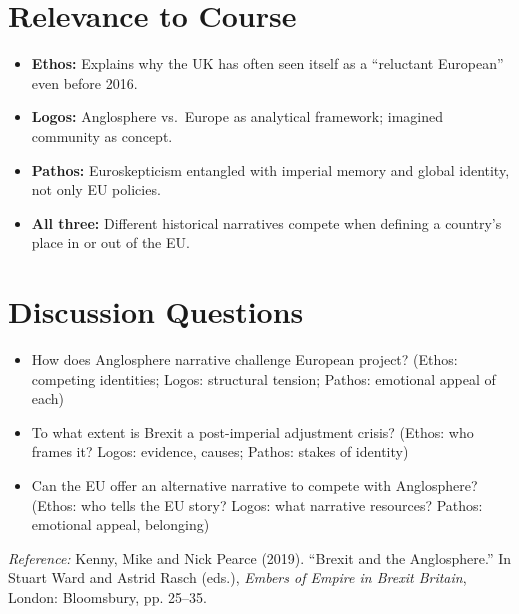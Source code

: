 \documentclass[11pt,a4paper]{article}
\begin{document}
\section*{Relevance to Course}

\begin{itemize}
\item \textbf{Ethos:} Explains why the UK has often seen itself as a ``reluctant European'' even before 2016.
\item \textbf{Logos:} Anglosphere vs.\ Europe as analytical framework; imagined community as concept.
\item \textbf{Pathos:} Euroskepticism entangled with imperial memory and global identity, not only EU policies.
\item \textbf{All three:} Different historical narratives compete when defining a country's place in or out of the EU.
\end{itemize}

\section*{Discussion Questions}

\begin{itemize}
\item How does Anglosphere narrative challenge European project? (Ethos: competing identities; Logos: structural tension; Pathos: emotional appeal of each)
\item To what extent is Brexit a post-imperial adjustment crisis? (Ethos: who frames it? Logos: evidence, causes; Pathos: stakes of identity)
\item Can the EU offer an alternative narrative to compete with Anglosphere? (Ethos: who tells the EU story? Logos: what narrative resources? Pathos: emotional appeal, belonging)
\end{itemize}

\vspace{1em}
\noindent\footnotesize\textit{Reference:} Kenny, Mike and Nick Pearce (2019). ``Brexit and the Anglosphere.'' In Stuart Ward and Astrid Rasch (eds.), \textit{Embers of Empire in Brexit Britain}, London: Bloomsbury, pp. 25--35.
\end{document}
